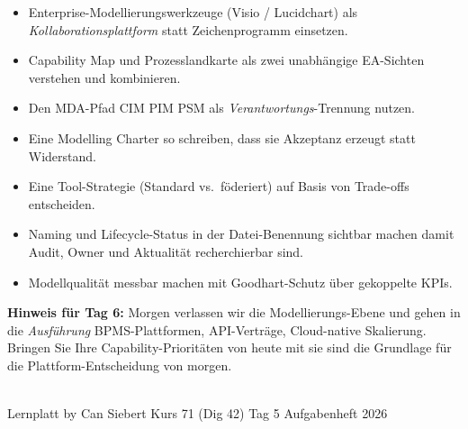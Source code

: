 \documentclass[11pt,a4paper,oneside]{article}
\begin{document}
\medskip
\begin{infobox}
\begin{itemize}
  \item Enterprise-Modellierungs\-werkzeuge (Visio / Lucidchart) als \emph{Kollaborationsplattform} statt Zeichenprogramm einsetzen.
  \item Capability Map und Prozesslandkarte als zwei unabh\"angige EA-Sichten verstehen und kombinieren.
  \item Den MDA-Pfad CIM \textrightarrow{} PIM \textrightarrow{} PSM als \emph{Verantwortungs}-Trennung nutzen.
  \item Eine Modelling Charter so schreiben, dass sie Akzeptanz erzeugt \textendash{} statt Widerstand.
  \item Eine Tool-Strategie (Standard vs.\ f\"oderiert) auf Basis von Trade-offs entscheiden.
  \item Naming und Lifecycle-Status in der Datei-Benennung sichtbar machen \textendash{} damit Audit, Owner und Aktualit\"at recherchierbar sind.
  \item Modellqualit\"at messbar machen \textendash{} mit Goodhart-Schutz \"uber gekoppelte KPIs.
\end{itemize}
\end{infobox}

\medskip
\noindent\textbf{Hinweis f\"ur Tag 6:} Morgen verlassen wir die Modellierungs-Ebene und gehen in die \emph{Ausf\"uhrung} \textendash{} BPMS-Plattformen, API-Vertr\"age, Cloud-native Skalierung. Bringen Sie Ihre Capability-Priorit\"aten von heute mit \textendash{} sie sind die Grundlage f\"ur die Plattform-Entscheidung von morgen.

\vspace{1cm}
\noindent{\color{lpAccent}\rule{\linewidth}{0.6pt}}\\[4pt]
{\footnotesize\sffamily\color{lpGray}Lernplatt \textperiodcentered{} by Can Siebert \textperiodcentered{} Kurs 71 (Dig 42) \textperiodcentered{} Tag 5 \textperiodcentered{} Aufgabenheft \textperiodcentered{} \textcopyright{} 2026}
\end{document}
